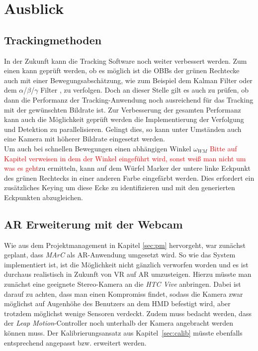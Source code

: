 \section{Ausblick}\label{sec:ausblick}
\subsection{Trackingmethoden}
In der Zukunft kann die Tracking Software noch weiter verbessert werden. Zum einen kann geprüft werden, ob es möglich ist die OBBs der grünen Rechtecke auch mit einer Bewegungsabschätzung, wie zum Beispiel dem Kalman Filter \cite{article:Kalman} oder dem $\alpha$/$\beta$/$\gamma$ Filter \cite{article:alphabetagamma}, zu verfolgen. Doch an dieser Stelle gilt es auch zu prüfen, ob dann die Performanz der Tracking-Anwendung noch ausreichend für das Tracking mit der gewünschten Bildrate ist. Zur Verbesserung der gesamten Performanz kann auch die Möglichkeit geprüft werden die Implementierung der Verfolgung und Detektion zu parallelisieren. Gelingt dies, so kann unter Umständen auch eine Kamera mit höherer Bildrate eingesetzt werden.\\
Um auch bei schnellen Bewegungen einen abhängigen Winkel $\omega_{WM}$ \textcolor{red}{Bitte auf Kapitel verweisen in dem der Winkel eingeführt wird, sonst weiß man nicht um was es geht}zu ermitteln, kann auf dem Würfel Marker der untere linke Eckpunkt des grünen Rechtecks in einer anderen Farbe eingefärbt werden. Dies erfordert ein zusätzliches Keying um diese Ecke zu identifizieren und mit den generierten Eckpunkten abzugleichen.

\subsection{AR Erweiterung mit der Webcam} \label{sec:PlanedWebcam}
Wie aus dem Projektmanagement in Kapitel \ref{sec:pm} hervorgeht, war zunächst geplant, dass \textit{MArC} als AR-Anwendung umgesetzt wird. So wie das System implementiert ist, ist die Möglichkeit nicht gänzlich verworfen worden und es ist durchaus realistisch in Zukunft von VR auf AR umzusteigen. Hierzu müsste man zunächst eine geeignete Stereo-Kamera an die \textit{HTC Vive} anbringen. Dabei ist darauf zu achten, dass man einen Kompromiss findet, sodass die Kamera zwar möglichst auf Augenhöhe des Benutzers an dem HMD befestigt wird, aber trotzdem möglichst wenige Sensoren verdeckt. Zudem muss bedacht werden, dass der \textit{Leap Motion}-Controller noch unterhalb der Kamera angebracht werden können muss. Der Kalibrierungsansatz aus Kapitel~\ref{sec:calib} müsste ebenfalls entsprechend angepasst bzw. erweitert werden. 

